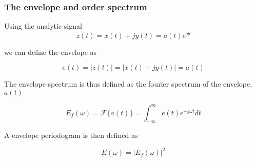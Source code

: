 \begin{frame}
    \frametitle{The envelope and order spectrum}
    \small
    
    Using the analytic signal
    \begin{equation}
        z(t)=x(t)+jy(t) = a(t) e^{j\theta}
    \end{equation}
    
    we can define the envelope as
    
    \begin{equation}
       e(t) = |z(t)| = | x(t) + jy(t) | = a(t)
    \end{equation}
   
   The envelope spectrum is thus defined as the fourier spectrum of the envelope, $a(t)$
   
   \begin{equation}
       E_{f}(\omega) = \mathscr{F}\{a(t)\} = \int_{-\infty}^{\infty} e(t) e^{-j\omega t} dt
   \end{equation}
   
   A envelope periodogram is then defined as 
   
   \begin{equation}
       E(\omega) = |E_{f}(\omega)|^2
   \end{equation}
   
\end{frame}